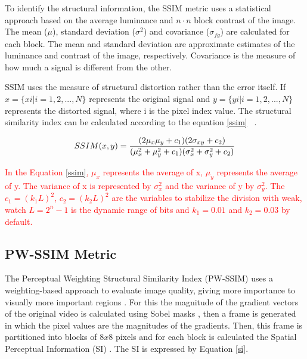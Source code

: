 \documentclass[journal]{IEEEtran}
\begin{document}
To identify the structural information, the SSIM metric uses a statistical approach based on the average luminance and $n \cdot n$ block contrast of the image. The mean ($\mu$), standard deviation ($\sigma^{2}$) and covariance ($\sigma_{fg}$) are calculated for each block. The mean and standard deviation are approximate estimates of the luminance and contrast of the image, respectively. Covariance is the measure of how much a signal is different from the other.

SSIM uses the measure of structural distortion rather than the error itself. If $x = \{x i | i = 1, 2,. . . , N\}$ represents the original signal and $y = \{y i | i = 1, 2,. . . , N\}$ represents the distorted signal, where i is the pixel index value. The structural similarity index can be calculated according to the equation \ref{ssim} ~\cite{oliveira:16}\cite{Wang:02}.

\begin{equation}
\label{ssim}
\centering
SSIM(x, y) = \frac{(2\mu _{x}\mu _{y} + c _{1})(2\sigma _{xy}+c _{2})}{(\mu_{x}^{2}+\mu_{y}^{2}+ c_{1})(\sigma _{x}^{2}+\sigma _{y}^{2}+c _{2})}
\end{equation}


\textcolor{red}{
In the Equation \ref{ssim},  $\mu_{x}$ represents the average of x,  $\mu_{y}$ represents the average of y. The variance of x is represented by $\sigma _{x}^{2}$ and the variance of y by $\sigma _{y}^{2}$. The $c_{1}=(k_{1}L)^{2}$, $c_{2}=(k_{2}L)^{2}$ are the variables to stabilize the division with weak, watch $L = 2^{n} - 1$ is the dynamic range of bits and $k_{1}=0.01$ and $k_{2}=0.03$ by default.
}





\subsection{PW-SSIM Metric}

The Perceptual Weighting Structural Similarity Index (PW-SSIM) uses a weighting-based approach to evaluate image quality, giving more importance to visually more important regions \cite{danilo:15a}. For this the magnitude of the gradient vectors of the original video is calculated using Sobel masks \cite{furnari:15}, then a frame is generated in which the pixel values are the magnitudes of the gradients. Then, this frame is partitioned into blocks of $8 x 8$ pixels and for each block is calculated the Spatial Perceptual Information (SI) \cite{jean:15}. The SI is expressed by Equation \ref{si}.
\end{document}
